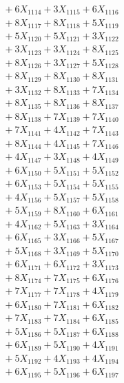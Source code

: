 \documentclass[a4paper,10pt]{article}
\begin{document}
{\begin{align}
&\;  + 6 X_{1114} + 3 X_{1115} + 6 X_{1116} \\[0.3ex]
&\;  + 8 X_{1117} + 8 X_{1118} + 5 X_{1119} \\[0.5ex]\allowbreak
&\;  + 5 X_{1120} + 5 X_{1121} + 3 X_{1122} \\[0.3ex]
&\;  + 3 X_{1123} + 3 X_{1124} + 8 X_{1125} \\[0.3ex]
&\;  + 8 X_{1126} + 3 X_{1127} + 5 X_{1128} \\[0.3ex]
&\;  + 8 X_{1129} + 8 X_{1130} + 8 X_{1131} \\[0.3ex]
&\;  + 3 X_{1132} + 8 X_{1133} + 7 X_{1134} \\[0.3ex]
&\;  + 8 X_{1135} + 8 X_{1136} + 8 X_{1137} \\[0.3ex]
&\;  + 8 X_{1138} + 7 X_{1139} + 7 X_{1140} \\[0.3ex]
&\;  + 7 X_{1141} + 4 X_{1142} + 7 X_{1143} \\[0.3ex]
&\;  + 8 X_{1144} + 4 X_{1145} + 7 X_{1146} \\[0.3ex]
&\;  + 4 X_{1147} + 3 X_{1148} + 4 X_{1149} \\[0.5ex]\allowbreak
&\;  + 6 X_{1150} + 5 X_{1151} + 5 X_{1152} \\[0.3ex]
&\;  + 6 X_{1153} + 5 X_{1154} + 5 X_{1155} \\[0.3ex]
&\;  + 4 X_{1156} + 5 X_{1157} + 5 X_{1158} \\[0.3ex]
&\;  + 5 X_{1159} + 8 X_{1160} + 6 X_{1161} \\[0.3ex]
&\;  + 4 X_{1162} + 5 X_{1163} + 3 X_{1164} \\[0.3ex]
&\;  + 6 X_{1165} + 3 X_{1166} + 5 X_{1167} \\[0.3ex]
&\;  + 5 X_{1168} + 3 X_{1169} + 5 X_{1170} \\[0.3ex]
&\;  + 6 X_{1171} + 6 X_{1172} + 3 X_{1173} \\[0.3ex]
&\;  + 8 X_{1174} + 7 X_{1175} + 6 X_{1176} \\[0.3ex]
&\;  + 7 X_{1177} + 7 X_{1178} + 4 X_{1179} \\[0.5ex]\allowbreak
&\;  + 6 X_{1180} + 7 X_{1181} + 6 X_{1182} \\[0.3ex]
&\;  + 7 X_{1183} + 7 X_{1184} + 6 X_{1185} \\[0.3ex]
&\;  + 5 X_{1186} + 5 X_{1187} + 6 X_{1188} \\[0.3ex]
&\;  + 6 X_{1189} + 5 X_{1190} + 4 X_{1191} \\[0.3ex]
&\;  + 5 X_{1192} + 4 X_{1193} + 4 X_{1194} \\[0.3ex]
&\;  + 6 X_{1195} + 5 X_{1196} + 6 X_{1197} \\[0.3ex]

\end{align}}
\end{document}
